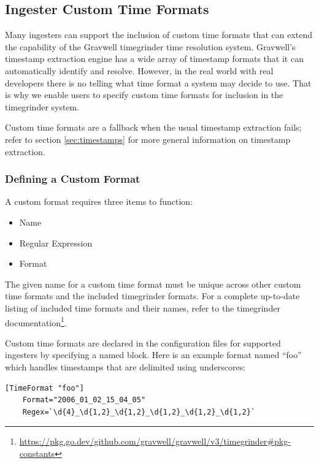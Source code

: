 \subsection{Ingester Custom Time Formats}

Many ingesters can support the inclusion of custom time formats that can extend the capability of the Gravwell timegrinder time resolution system.  Gravwell's timestamp extraction engine has a wide array of timestamp formats that it can automatically identify and resolve.  However, in the real world with real developers there is no telling what time format a system may decide to use.  That is why we enable users to specify custom time formats for inclusion in the timegrinder system.

Custom time formats are a fallback when the usual timestamp extraction fails; refer to section \ref{sec:timestamps} for more general information on timestamp extraction.

\subsubsection{Defining a Custom Format}

A custom format requires three items to function:

\begin{itemize}
\item Name
\item Regular Expression
\item Format
\end{itemize}

The given name for a custom time format must be unique across other custom time formats and the included timegrinder formats.  For a complete up-to-date listing of included time formats and their names, refer to the timegrinder documentation\footnote{\href{https://pkg.go.dev/github.com/gravwell/gravwell/v3/timegrinder\#pkg-constants}{https://pkg.go.dev/github.com/gravwell/gravwell/v3/timegrinder\#pkg-constants}}.

Custom time formats are declared in the configuration files for supported ingesters by specifying a named  block.  Here is an example format named ``foo'' which handles timestamps that are delimited using underscores:

\begin{verbatim}
[TimeFormat "foo"]
	Format="2006_01_02_15_04_05"
	Regex=`\d{4}_\d{1,2}_\d{1,2}_\d{1,2}_\d{1,2}_\d{1,2}`
\end{verbatim}

